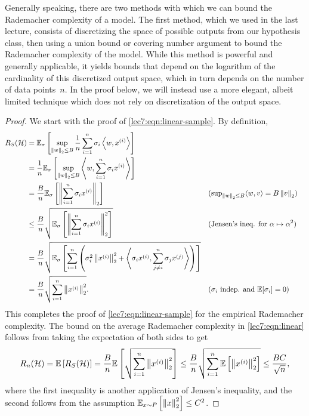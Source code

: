 Generally speaking, there are two methods with which we can bound the Rademacher complexity of a model. The first method, which we used in the last lecture, consists of discretizing the space of possible outputs from our hypothesis class, then using a union bound or covering number argument to bound the Rademacher complexity of the model. While this method is powerful and generally applicable, it yields bounds that depend on the logarithm of the cardinality of this discretized output space, which in turn depends on the number of data points~$n$. In the proof below, we will instead use a more elegant, albeit limited technique which does not rely on discretization of the output space.

\begin{proof}
We start with the proof of \eqref{lec7:eqn:linear-sample}. By definition,
\begin{align}
    R_S(\mathcal{H}) 
    &= \mathbb{E}_\sigma\left[ \sup_{\left\|w\right\|_2 \le B} \frac{1}{n} \sum_{i=1}^n\sigma_i \left\langle w,x^{(i)}\right\rangle \right]
    \\&= \frac{1}{n} \mathbb{E}_\sigma\left[ \sup_{\left\|w\right\|_2 \le B} \left\langle w,\sum_{i=1}^n\sigma_i x^{(i)}\right\rangle \right]
    \\&= \frac{B}{n} \mathbb{E}_\sigma\left[ \left\|\sum_{i=1}^n \sigma_i  x^{(i)}\right\|_2 \right]
        &&\text{($\textstyle\sup_{\left\|w\right\|_2 \le B} \langle w,v\rangle =B\left\|v\right\|_2$)}
    \\&\leq \frac{B}{n} \sqrt{ \mathbb{E}_\sigma\left[\left\| \sum_{i=1}^n \sigma_i x^{(i)} \right\|_2^2\right] }
        &&\text{(Jensen's ineq. for $\alpha \mapsto \alpha^2$)} 
    \\&= \frac{B}{n} \sqrt{ \mathbb{E}_\sigma \left[\sum_{i=1}^n \left(\sigma_i^2 \left\|x^{(i)}\right\|_2^2 + \left\langle\sigma_ix^{(i)},\sum_{j \ne i}^n \sigma_j x^{(j)}\right\rangle \right)\right] }
    \\&= \frac{B}{n} \sqrt{\sum_{i=1}^n \left\|x^{(i)}\right\|_2^2}.
        &&\text{($\sigma_i$ indep. and $\mathbb{E}[\sigma_i]=0$)}
\end{align}
This completes the proof of \eqref{lec7:eqn:linear-sample} for the empirical Rademacher complexity. The bound on the average Rademacher complexity in \eqref{lec7:eqn:linear} follows from taking the expectation of both sides to get
\begin{equation}
    R_n(\mathcal{H}) = \mathbb{E}\left[ R_S(\mathcal{H}) \right]
    = \frac{B}{n} \mathbb{E}\left[ \sqrt{\sum_{i=1}^n \left\|x^{(i)}\right\|_2^2} \right]
    \le \frac{B}{n} \sqrt{ \sum_{i=1}^n \mathbb{E}\left[\left\|x^{(i)}\right\|_2^2\right] }
    \le \frac{BC}{\sqrt{n}},
\end{equation}
where the first inequality is another application of Jensen's inequality, and the second follows from the assumption $\operatorname*{\mathbb{E}}_{x \sim P}\left[\left\|x\right\|_2^2\right] \leq C^2$.

\end{proof}


